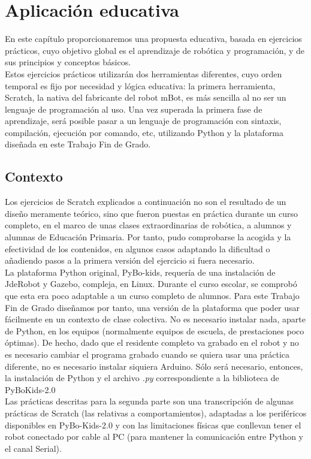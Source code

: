 \chapter{Aplicación educativa}\label{cap:aplicationEducativa}
En este capítulo proporcionaremos una propuesta educativa,  basada en ejercicios prácticos, cuyo objetivo global es el aprendizaje de robótica y programación, y de sus principios y conceptos básicos. \\
Estos ejercicios prácticos utilizarán dos herramientas diferentes, cuyo orden temporal es fijo por necesidad y lógica educativa: la primera herramienta, Scratch, la nativa del fabricante del robot mBot, es más sencilla al no ser un lenguaje de programación al uso. Una vez superada la primera fase de aprendizaje, será posible pasar a un lenguaje de programación con sintaxis, compilación, ejecución por comando, etc, utilizando Python y la plataforma diseñada en este Trabajo Fin de Grado. 
\section{Contexto}\label{sec:contexto}
Los ejercicios de Scratch explicados a continuación no son el resultado de un diseño meramente teórico, sino que fueron puestas en práctica durante un curso completo, en el marco de unas clases extraordinarias de robótica, a alumnos y alumnas de Educación Primaria. Por tanto, pudo comprobarse la acogida y la efectividad de los contenidos, en algunos casos adaptando la dificultad o añadiendo pasos a la primera versión del ejercicio si fuera necesario. \\
La plataforma Python original, PyBo-kids, requería de una instalación de JdeRobot y Gazebo, compleja, en Linux. Durante el curso escolar, se comprobó que esta era poco adaptable a un curso  completo de alumnos. Para este Trabajo Fin de Grado diseñamos por tanto, una versión de la plataforma que poder usar fácilmente en un contexto de clase colectiva. No es necesario instalar nada, aparte de Python, en los equipos (normalmente equipos de escuela, de prestaciones poco óptimas). De hecho, dado que el residente completo va grabado en el robot y no es necesario cambiar el programa grabado cuando se quiera usar una práctica diferente, no es necesario instalar siquiera Arduino. Sólo será necesario, entonces, la instalación de Python y el archivo \textit{.py} correspondiente a la biblioteca de PyBoKids-2.0 \\
Las prácticas descritas para la segunda parte son una transcripción de algunas prácticas de Scratch (las relativas a comportamientos), adaptadas a los periféricos disponibles en PyBo-Kids-2.0 y con las limitaciones físicas que conllevan tener el robot conectado por cable al PC (para mantener la comunicación entre Python y el canal Serial). 


